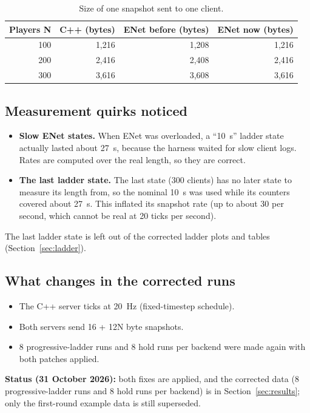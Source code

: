 \begin{table}[H]
\centering
\small
\begin{tabular}{rrrr}
\toprule
Players N & C++ (bytes) & ENet before (bytes) & ENet now (bytes) \\
\midrule
100 & 1,216 & 1,208 & 1,216 \\
200 & 2,416 & 2,408 & 2,416 \\
300 & 3,616 & 3,608 & 3,616 \\
\bottomrule
\end{tabular}
\caption{Size of one snapshot sent to one client.}
\label{tab:snapsize}
\end{table}

\subsection{Measurement quirks noticed}
\begin{itemize}
\item \textbf{Slow ENet states.} When ENet was overloaded, a ``10~s'' ladder state actually lasted about 27~s, because the harness waited for slow client logs. Rates are computed over the real length, so they are correct.
\item \textbf{The last ladder state.} The last state (300 clients) has no later state to measure its length from, so the nominal 10~s was used while its counters covered about 27~s. This inflated its snapshot rate (up to about 30 per second, which cannot be real at 20 ticks per second).
\end{itemize}
The last ladder state is left out of the corrected ladder plots and tables (Section~\ref{sec:ladder}).

\subsection{What changes in the corrected runs}
\begin{itemize}
\item The C++ server ticks at 20~Hz (fixed-timestep schedule).
\item Both servers send 16 + 12N byte snapshots.
\item 8 progressive-ladder runs and 8 hold runs per backend were made again with both patches applied.
\end{itemize}
\textbf{Status (31 October 2026):} both fixes are applied, and the corrected data (8 progressive-ladder runs and 8 hold runs per backend) is in Section~\ref{sec:results}; only the first-round example data is still superseded.

